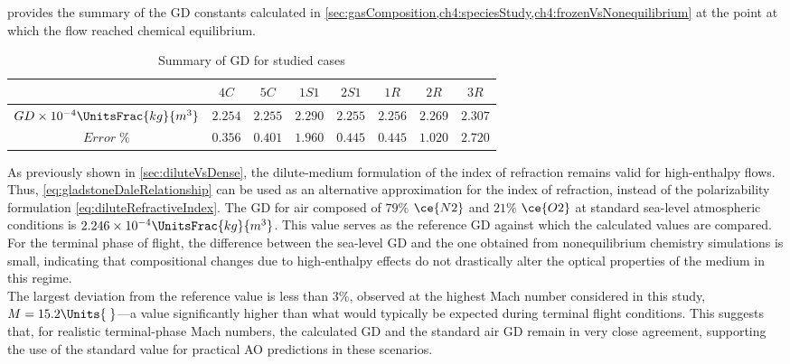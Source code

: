  provides the summary of the \gls{GD} constants calculated
in \cref{sec:gasComposition,ch4:speciesStudy,ch4:frozenVsNonequilibrium} at the
point at which the flow reached chemical equilibrium.
\begin{table}[H]
\begin{center}
\begin{tabular}{|c|c|c|c|c|c|c|c|}
\hline
$ \;$ & $4C$ & $5C$ & $1S1$ & $2S1$ & $1R$ & $2R$ & $3R$ \\
\hline
$GD \times 10^{-4}\UnitsFrac{kg}{m^3}$ & $2.254$ & $2.255$ & $2.290$ &
$2.255$ & $2.256$ & $2.269$ & $2.307$ \\
\hline
$Error \;\%$ & $0.356$ & $0.401$ & $1.960$ & $0.445$ & $0.445$ &
$1.020$ & $2.720$ \\
\hline
\end{tabular}
\caption{Summary of \acrlong{GD} for studied
cases}\label{tab:summaryGD}
\end{center}
\end{table}
As previously shown in \cref{sec:diluteVsDense}, the dilute-medium formulation of the index of refraction remains
valid for high-enthalpy flows. Thus, \cref{eq:gladstoneDaleRelationship} can be
used as an alternative approximation for the index of refraction, instead of
the polarizability formulation \cref{eq:diluteRefractiveIndex}. The \gls{GD}
for air composed of $79\%$ $\ce{N2}$ and $21\%$ $\ce{O2}$ at
standard sea-level atmospheric conditions is
$2.246\times10^{-4}\UnitsFrac{kg}{m^3}$. This value serves as the reference
\gls{GD} against which the calculated values are compared. \\

For the terminal phase of flight, the difference between the sea-level
\gls{GD} and the one obtained from nonequilibrium chemistry simulations is
small, indicating that compositional changes due to high-enthalpy effects do
not drastically alter the optical properties of the medium in this regime.\\

The largest deviation from the reference value is less than $3\%$, observed at
the highest Mach number considered in this study,
$M = 15.2\Units{\;}$—a value significantly higher than what would typically be
expected during terminal flight conditions. This suggests that, for realistic
terminal-phase Mach numbers, the calculated \gls{GD} and the standard air
\gls{GD} remain in very close agreement, supporting the use of the standard
value for practical \gls{AO} predictions in these scenarios. \\

